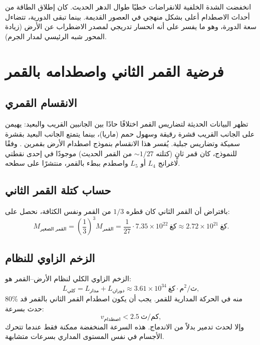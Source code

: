 \documentclass[11pt,a4paper]{article}
\begin{document}
	انخفضت الشدة الخلفية للانقراضات خطيًا طوال الدهر الحديث. كان إطلاق الطاقة من أحداث الاصطدام أعلى بشكل منهجي في العصور القديمة. بينما تبقى الدورية، تتضاءل سعة الدورة، وهو ما يفسر على أنه انحسار تدريجي لمصدر الاضطراب عن الأرض (زيادة المحور شبه الرئيسي لمدار الجرم).
	
	\section{فرضية القمر الثاني واصطدامه بالقمر}
	
	\subsection{الانقسام القمري}
	
	تظهر البيانات الحديثة لتضاريس القمر اختلافًا حادًا بين الجانبين القريب والبعيد: يهيمن على الجانب القريب قشرة رقيقة وسهول حمم (ماريا)، بينما يتمتع الجانب البعيد بقشرة سميكة وتضاريس جبلية. يُفسر هذا الانقسام بنموذج اصطدام الأرض بقمرين \cite{JutziAsphaug2011}. وفقًا للنموذج، كان قمر ثانٍ (كتلته \(\sim 1/27\) من القمر الحديث) موجودًا في إحدى نقطتي لاغرانج \(L_4\) أو \(L_5\) واصطدم ببطء بالقمر، منتشرًا على سطحه.
	
	\subsection{حساب كتلة القمر الثاني}
	
	بافتراض أن القمر الثاني كان قطره \(1/3\) من القمر ونفس الكثافة، نحصل على:
	{\small
		\[
		M_{\text{القمر الصغير}} = \left(\frac{1}{3}\right)^3 M_{\text{القمر}} = \frac{1}{27} \cdot 7.35 \times 10^{22}\ \text{كغ} \approx 2.72 \times 10^{21}\ \text{كغ}.
		\]}
	
	\subsection{الزخم الزاوي للنظام}
	
	الزخم الزاوي الكلي لنظام الأرض–القمر هو:
	\[
	L_{\text{كلي}} = L_{\text{مدار}} + L_{\text{دوران}} \approx 3.61 \times 10^{34}\ \text{كغ}\cdot\text{م}^2/\text{ث},
	\]
	80\% منه في الحركة المدارية للقمر. يجب أن يكون اصطدام القمر الثاني بالقمر قد حدث بسرعة:
	\[
	v_{\text{اصطدام}} < 2.5\ \text{كم/ث},
	\]
	وإلا لحدث تدمير بدلاً من الاندماج. هذه السرعة المنخفضة ممكنة فقط عندما تتحرك الأجسام في نفس المستوى المداري بسرعات متشابهة.
	
\end{document}
